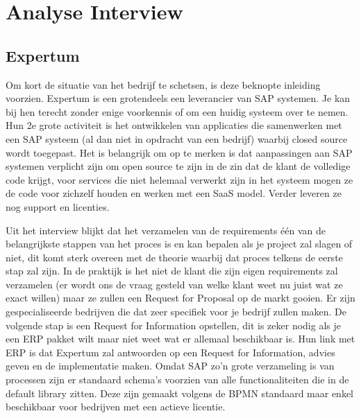 
\chapter{Analyse Interview}
\label{ch:analyse_interview}

\section{Expertum}

Om kort de situatie van het bedrijf te schetsen, is deze beknopte inleiding voorzien. Expertum is een grotendeels een leverancier van SAP systemen. Je kan bij hen terecht zonder enige voorkennis of om een huidig systeem over te nemen. Hun 2e grote activiteit is het ontwikkelen van applicaties die samenwerken met een SAP systeem (al dan niet in opdracht van een bedrijf) waarbij closed source wordt toegepast. Het is belangrijk om op te merken is dat aanpassingen aan SAP systemen verplicht zijn om open source te zijn in de zin dat de klant de volledige code krijgt, voor services die niet helemaal verwerkt zijn in het systeem mogen ze de code voor zichzelf houden en werken met een SaaS model. Verder leveren ze nog support en licenties.

Uit het interview blijkt dat het verzamelen van de requirements één van de belangrijkste stappen van het proces is en kan bepalen als je project zal slagen of niet, dit komt sterk overeen met de theorie waarbij dat proces telkens de eerste stap zal zijn. In de praktijk is het niet de klant die zijn eigen requirements zal verzamelen (er wordt ons de vraag gesteld van welke klant weet nu juist wat ze exact willen) maar ze zullen een Request for Proposal op de markt gooien. Er zijn gespecialiseerde bedrijven die dat zeer specifiek voor je bedrijf zullen maken. De volgende stap is een Request for Information opstellen, dit is zeker nodig als je een ERP pakket wilt maar niet weet wat er allemaal beschikbaar is. Hun link met ERP is dat Expertum zal antwoorden op een Request for Information, advies geven en de implementatie maken. Omdat SAP zo'n grote verzameling is van processen zijn er standaard schema's voorzien van alle functionaliteiten die in de default library zitten. Deze zijn gemaakt volgens de BPMN standaard maar enkel beschikbaar voor bedrijven met een actieve licentie. 

